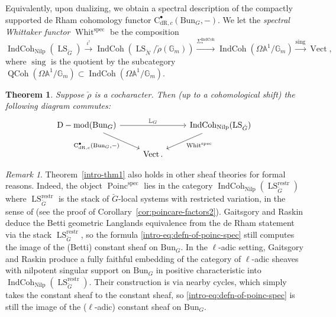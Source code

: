 \documentclass[11pt]{amsart}
\newcommand{\bG}{\mathbb{G}}
\newcommand{\bA}{\mathbb{A}}
\newcommand{\cC}{{\mathrm C}}
\newcommand{\spec}{\mathrm{spec}}
\newcommand{\dR}{\mathrm{dR}}
\newcommand{\Vect}{\operatorname{Vect}}
\newcommand{\Bun}{{\mathrm{Bun}}}
\newcommand{\Whit}{\operatorname{Whit}}
\newcommand{\Poinc}{\operatorname{Poinc}}
\newcommand{\Nilp}{\mathrm{Nilp}}
\newcommand{\sing}{\operatorname{sing}}
\DeclareMathOperator{\QCoh}{QCoh}
\DeclareMathOperator{\Dmod}{D-mod}
\DeclareMathOperator{\IndCoh}{IndCoh}
\DeclareMathOperator{\LS}{LS}
\newtheorem{thm}{Theorem}[section]
\theoremstyle{remark}
\newtheorem*{remark}{Remark}
\theoremstyle{definition}
\begin{document}
Equivalently, upon dualizing, we obtain a spectral description of the compactly supported de Rham cohomology functor $\cC_{\dR,c}^\bullet(\Bun_G,-)$. We let the \emph{spectral Whittaker functor} $\Whit^\spec$ be the composition
\[
\IndCoh_\Nilp(\LS_{\check G})\xrightarrow{\iota^!}\IndCoh(\LS_{\check N}/\check\rho(\bG_m))\xrightarrow{\Sigma_*^{\IndCoh}}\IndCoh(\Omega\bA^1/\bG_m)\xrightarrow{\sing}\Vect,
\]
where $\sing$ is the quotient by the subcategory $\QCoh(\Omega\bA^1/\bG_m)\subset \IndCoh(\Omega\bA^1/\bG_m)$.
\begin{thm}\label{intro-thm2}
    Suppose $\check\rho$ is a cocharacter. Then (up to a cohomological shift) the following diagram commutes:
    \begin{equation}\label{eq:whittaker-cohomology}
\begin{tikzcd}
    \Dmod(\Bun_G)\arrow{rr}{\mathbb L_G}\arrow[swap]{dr}{\cC^\bullet_{\dR,c}(\Bun_G,-)}&&\IndCoh_\Nilp(\LS_{\check G})\arrow{dl}{\Whit^\spec}\\
    &\Vect.
\end{tikzcd}
\end{equation}
\end{thm}
\begin{remark}
    Theorem~\ref{intro-thm1} also holds in other sheaf theories for formal reasons. 
Indeed, the object $\Poinc^\spec$ lies in the category $\IndCoh_\Nilp(\LS_{\check G}^{\mathrm{restr}})$ where $\LS_{\check G}^{\mathrm{restr}}$ is the stack of $\check G$-local systems with restricted variation, in the sense of \cite{AGKRRV} (see the proof of Corollary~\ref{cor:poincare-factors2}). Gaitsgory and Raskin \cite{GLC1} deduce the Betti geometric Langlands equivalence from the de Rham statement via the stack $\LS_{\check G}^{\mathrm{restr}}$, so the formula \eqref{intro-eq:defn-of-poinc-spec} still computes the image of the (Betti) constant sheaf on $\Bun_G$. In the $\ell$-adic setting, Gaitsgory and Raskin \cite{GLC-l-adic} produce a fully faithful embedding of the category of $\ell$-adic sheaves with nilpotent singular support on $\Bun_G$ in positive characteristic into $\operatorname{IndCoh}_{\mathrm{Nilp}}(\LS_{\check G}^{\mathrm{restr}})$. Their construction is via nearby cycles, which simply takes the constant sheaf to the constant sheaf, so \eqref{intro-eq:defn-of-poinc-spec} is still the image of the ($\ell$-adic) constant sheaf on $\Bun_G$.
\end{remark}
\end{document}
